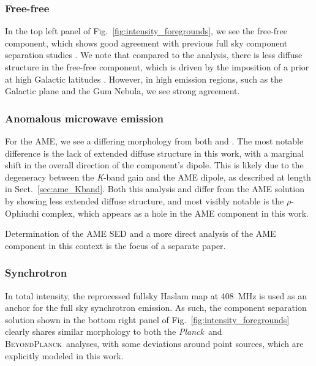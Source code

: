 \documentclass[twocolumn]{../../common/aa}
\def\Planck{\emph{Planck}}
\newcommand{\BP}{\textsc{BeyondPlanck}}
\newcommand{\K}[0]{\textit K}
\begin{document}
\subsubsection{Free-free}\label{subsubsec:ff}

In the top left panel of Fig.~\ref{fig:intensity_foregrounds}, we see the free-free component, which shows good agreement with previous full sky component separation studies \citep{planck2014-a12,bp13}. We note that compared to the \cite{planck2014-a12} analysis, there is less diffuse structure in the free-free component, which is driven by the imposition of a prior at high Galactic latitudes \citep{bp13}. However, in high emission regions, such as the Galactic plane and the Gum Nebula, we see strong agreement.

\subsubsection{Anomalous microwave emission}\label{subsubsec:ame}

For the AME, we see a differing morphology from both \cite{planck2014-a12} and \cite{bp13}. The most notable difference is the lack of extended diffuse structure in this work, with a marginal shift in the overall direction of the component's dipole. This is likely due to the degeneracy between the \K-band gain and the AME dipole, as described at length in Sect.~\ref{sec:ame_Kband}. Both this analysis and \cite{bp13} differ from the \cite{planck2014-a12} AME solution by showing less extended diffuse structure, and most visibly notable is the $\rho$-Ophiuchi complex, which appears as a hole in the AME component in this work. 

Determination of the AME SED and a more direct analysis of the AME component in this context is the focus of a separate paper.

\subsubsection{Synchrotron}\label{subsub:synch}

In total intensity, the reprocessed fullsky Haslam map \citep{remazeilles2014} at 408~MHz is used as an anchor for the full sky synchrotron emission. As such, the component separation solution shown in the bottom right panel of Fig.~\ref{fig:intensity_foregrounds} clearly shares similar morphology to both the \Planck\ and \BP\ analyses, with some deviations around point sources, which are explicitly modeled in this work. 
\end{document}
